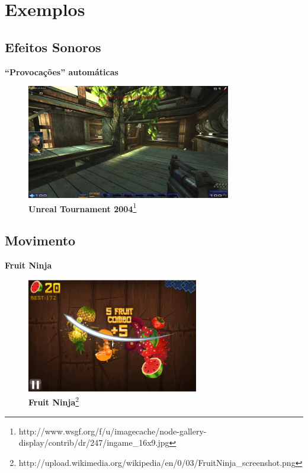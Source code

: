 \expandafter\documentclass\expandafter[table, usenames, svgnames, dvipsnames, \classopts]{beamer}
\begin{document}
\section{Exemplos}

\subsection{Efeitos Sonoros}
\begin{frame}{\textbf{``Provocações'' automáticas}}
	\centering
	\begin{figure}
        \includegraphics[draft,height=5cm]{taunt}
        \caption{\scriptsize\textbf{Unreal Tournament 2004}\footnote{http://www.wsgf.org/f/u/imagecache/node-gallery-display/contrib/dr/247/ingame\_16x9.jpg}}
	\end{figure}
\end{frame}

\subsection{Movimento}
\begin{frame}{\textbf{Fruit Ninja}}
	\centering
	\begin{figure}
        \includegraphics[draft,height=5cm]{fruit_ninja}
        \caption{\scriptsize\textbf{Fruit Ninja}\footnote{http://upload.wikimedia.org/wikipedia/en/0/03/FruitNinja\_screenshot.png}}
	\end{figure}
\end{frame}
\end{document}
